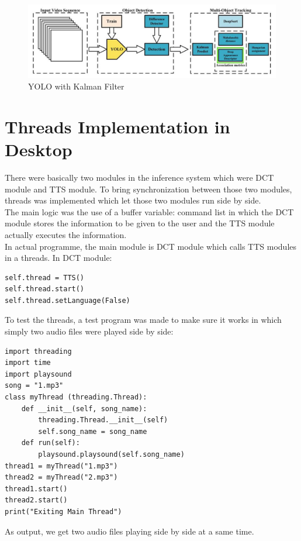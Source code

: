             \begin{figure}[ht]
                \centering
                \includegraphics[scale=0.4]{img/deep_sort.png}
                \caption{YOLO with Kalman Filter}
                \label{fig: Deepsort algorithm}
            \end{figure}
            \pagebreak

        \section{Threads Implementation in Desktop}
            There were basically two modules in the inference system which were DCT module and TTS module. To bring synchronization between those two modules, threads was implemented which let those two modules run side by side.\\
            The main logic was the use of a buffer variable: command list in which the DCT module stores the information to be given to the user and the TTS module actually executes the information.\\
            In actual programme, the main module is DCT module which calls TTS modules in a threads. In DCT module:
\begin{verbatim}
self.thread = TTS()
self.thread.start()
self.thread.setLanguage(False)
\end{verbatim}
            To test the threads, a test program was made to make sure it works in which simply two audio files were played side by side:
\begin{verbatim}
import threading
import time
import playsound
song = "1.mp3"
class myThread (threading.Thread):
    def __init__(self, song_name):
        threading.Thread.__init__(self)
        self.song_name = song_name
    def run(self):
        playsound.playsound(self.song_name)
thread1 = myThread("1.mp3")
thread2 = myThread("2.mp3")
thread1.start()
thread2.start()
print("Exiting Main Thread")
\end{verbatim}
            As output, we get two audio files playing side by side at a same time.

